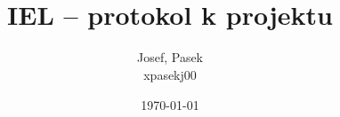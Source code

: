 \documentclass[fleqn]{fitiel} %
\title{\logo\\IEL -- protokol k projektu}
\author{Josef, Pasek \\ xpasekj00}
\date{\today} %
\begin{document}
	\maketitle

	\tableofcontents

	\newpage
    \sloppy
	 \newpage
	 \newpage
	 \newpage
	 \newpage
	 \newpage

	
\end{document}
